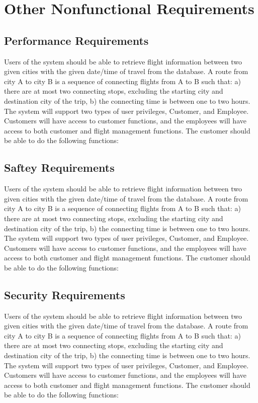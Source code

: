 \documentclass{scrreprt}
\begin{document}
    \chapter{Other Nonfunctional Requirements}
    \section{Performance Requirements} 
    Users of the system should be able to retrieve flight information between two given cities with the given date/time of travel from the database. A route from city A to city B is a sequence of connecting flights from A to B such that: a) there are at most two connecting stops, excluding the starting city and destination city of the trip, b) the connecting time is between one to two hours. The system will support two types of user privileges, Customer, and Employee. Customers will have access to customer functions, and the employees will have access to both customer and flight management functions. The customer should be able to do the following functions: 
    \section{Saftey Requirements}
    Users of the system should be able to retrieve flight information between two given cities with the given date/time of travel from the database. A route from city A to city B is a sequence of connecting flights from A to B such that: a) there are at most two connecting stops, excluding the starting city and destination city of the trip, b) the connecting time is between one to two hours. The system will support two types of user privileges, Customer, and Employee. Customers will have access to customer functions, and the employees will have access to both customer and flight management functions. The customer should be able to do the following functions: 
    \section{Security Requirements}
    Users of the system should be able to retrieve flight information between two given cities with the given date/time of travel from the database. A route from city A to city B is a sequence of connecting flights from A to B such that: a) there are at most two connecting stops, excluding the starting city and destination city of the trip, b) the connecting time is between one to two hours. The system will support two types of user privileges, Customer, and Employee. Customers will have access to customer functions, and the employees will have access to both customer and flight management functions. The customer should be able to do the following functions: 
\end{document}
